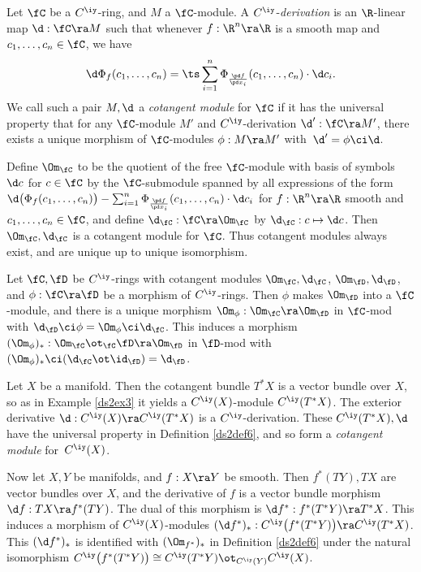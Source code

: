 \documentclass{article}
\begin{document}
\begin{dfn} Let $\fC$ be a $C^\iy$-ring, and $M$ a
$\fC$-module. A $C^\iy$-{\it derivation} is an $\R$-linear map
$\d:\fC\ra M$ such that whenever $f:\R^n\ra\R$ is a smooth map and
$c_1,\ldots,c_n\in\fC$, we have
\begin{equation*}
\d\Phi_f(c_1,\ldots,c_n)=\ts\sum_{i=1}^n\Phi_{\frac{\pd f}{\pd
x_i}}(c_1,\ldots,c_n)\cdot\d c_i.
\end{equation*}
We call such a pair $M,\d$ a {\it cotangent module\/} for $\fC$ if
it has the universal property that for any $\fC$-module $M'$ and
$C^\iy$-derivation $\d':\fC\ra M'$, there exists a unique morphism
of $\fC$-modules $\phi:M\ra M'$ with~$\d'=\phi\ci\d$.

Define $\Om_\fC$ to be the quotient of the free $\fC$-module with
basis of symbols $\d c$ for $c\in\fC$ by the $\fC$-submodule spanned
by all expressions of the form
$\d\bigl(\Phi_f(c_1,\ldots,c_n)\bigr)-\sum_{i=1}^n \Phi_{\frac{\pd
f}{\pd x_i}}(c_1,\ldots,c_n)\cdot\d c_i$ for $f:\R^n\ra\R$ smooth
and $c_1,\ldots,c_n\in\fC$, and define $\d_\fC:\fC\ra \Om_\fC$ by
$\d_\fC:c\mapsto\d c$. Then $\Om_\fC,\d_\fC$ is a cotangent module
for $\fC$. Thus cotangent modules always exist, and are unique up to
unique isomorphism.

Let $\fC,\fD$ be $C^\iy$-rings with cotangent modules
$\Om_\fC,\d_\fC$, $\Om_\fD,\d_\fD$, and $\phi:\fC\ra\fD$ be a
morphism of $C^\iy$-rings. Then $\phi$ makes $\Om_\fD$ into a
$\fC$-module, and there is a unique morphism
$\Om_\phi:\Om_\fC\ra\Om_\fD$ in $\fC$-mod with
$\d_\fD\ci\phi=\Om_\phi\ci\d_\fC$. This induces a morphism
$(\Om_\phi)_*:\Om_\fC\ot_\fC\fD\ra\Om_\fD$ in $\fD$-mod
with~$(\Om_\phi)_*\ci (\d_\fC\ot\id_\fD)=\d_\fD$.
\label{ds2def6}
\end{dfn}

\begin{ex} Let $X$ be a manifold. Then the cotangent bundle $T^*X$
is a vector bundle over $X$, so as in Example \ref{ds2ex3} it yields
a $C^\iy(X)$-module $C^\iy(T^*X)$. The exterior derivative
$\d:C^\iy(X)\ra C^\iy(T^*X)$ is a $C^\iy$-derivation. These
$C^\iy(T^*X),\d$ have the universal property in Definition
\ref{ds2def6}, and so form a {\it cotangent module\/}
for~$C^\iy(X)$.

Now let $X,Y$ be manifolds, and $f:X\ra Y$ be smooth. Then
$f^*(TY),TX$ are vector bundles over $X$, and the derivative of $f$
is a vector bundle morphism $\d f:TX\ra f^*(TY)$. The dual of this
morphism is $\d f^*:f^*(T^*Y)\ra T^*X$. This induces a morphism of
$C^\iy(X)$-modules $(\d f^*)_*:C^\iy\bigl(f^*(T^*Y)\bigr)\ra
C^\iy(T^*X)$. This $(\d f^*)_*$ is identified with $(\Om_{f^*})_*$
in Definition \ref{ds2def6} under the natural isomorphism
$C^\iy\bigl(f^*(T^*Y)\bigr)\cong C^\iy(T^*Y)\ot_{C^\iy(Y)}C^\iy(X)$.
\label{ds2ex4}
\end{ex}
\end{document}
